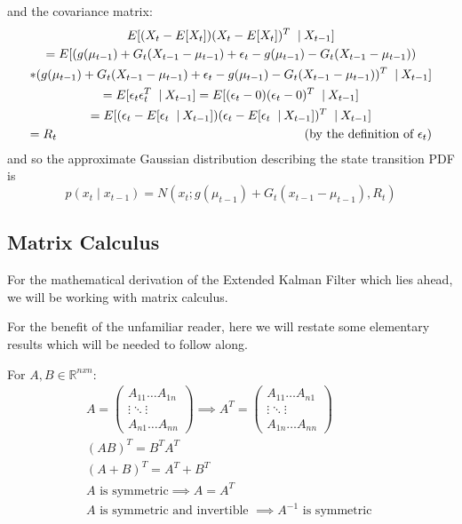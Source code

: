 and the covariance matrix:
\begin{multline*}
E[(X_t - E[X_t])(X_t - E[X_t])^T\ \mathbin{\vert} X_{t-1}] \\ = E[(g(\mu_{t-1}) + G_t (X_{t-1} - \mu_{t-1}) + \epsilon_t - g(\mu_{t-1}) - G_t (X_{t-1} - \mu_{t-1})) \\
* (g(\mu_{t-1}) + G_t (X_{t-1} - \mu_{t-1}) + \epsilon_t - g(\mu_{t-1}) - G_t (X_{t-1} - \mu_{t-1}))^T\ \mathbin{\vert} X_{t-1}] \\
= E[\epsilon_t \epsilon_t^T\ \mathbin{\vert} X_{t-1}] = E[(\epsilon_t - 0)(\epsilon_t - 0)^T\ \mathbin{\vert} X_{t-1}] \\
= E[(\epsilon_t - E[\epsilon_t\ \mathbin{\vert} X_{t-1}])(\epsilon_t - E[\epsilon_t\ \mathbin{\vert} X_{t-1}])^T\ \mathbin{\vert} X_{t-1}] \\
= R_t \hfill \text{(by the definition of \(\epsilon_t\))} \end{multline*}
and so the approximate Gaussian distribution describing the state transition PDF is
\begin{equation} \label{eqStateTransitionNormalDef}
p(x_t \mathbin{\vert} x_{t-1}) = N(x_t;g(\mu_{t-1}) + G_t (x_{t-1} - \mu_{t-1}),R_t)
\end{equation}

\subsection{Matrix Calculus}
For the mathematical derivation of the Extended Kalman Filter which lies ahead, we will be working with matrix calculus.

For the benefit of the unfamiliar reader, here we will restate some elementary results which will be needed to follow along.

For \(A,B \in \mathbb{R}^{nxn}\):
\begin{gather}
A = \begin{pmatrix}
A_{11}  \dots A_{1n} \\
\vdots  \ddots  \vdots \\
A_{n1} \dots  A_{nn}
\end{pmatrix} \implies A^T = \begin{pmatrix}
A_{11}  \dots A_{n1} \\
\vdots  \ddots  \vdots  \\
A_{1n} \dots A_{nn}
\end{pmatrix} \\
(AB)^T = B^T A^T \\
(A+B)^T = A^T + B^T \\
A \text{ is symmetric} \implies A = A^T \\
A \text{ is symmetric and invertible } \implies A^{-1} \text{ is symmetric } 
\end{gather}

